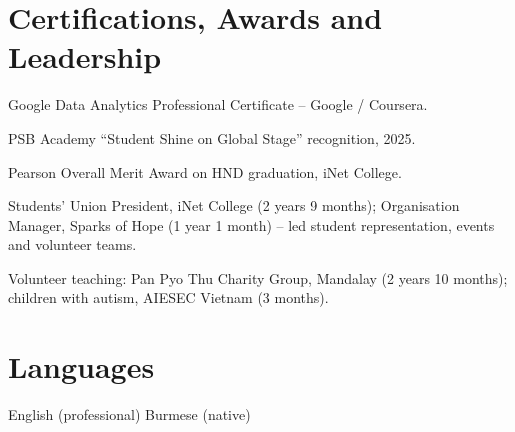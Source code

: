 \documentclass[letterpaper,10pt]{article}
\begin{document}
\section*{Certifications, Awards and Leadership}
\begin{tight}
  \item Google Data Analytics Professional Certificate -- Google / Coursera.
  \item PSB Academy ``Student Shine on Global Stage'' recognition, 2025.
  \item Pearson Overall Merit Award on HND graduation, iNet College.
  \item Students' Union President, iNet College (2 years 9 months); Organisation Manager,
  Sparks of Hope (1 year 1 month) -- led student representation, events and volunteer teams.
  \item Volunteer teaching: Pan Pyo Thu Charity Group, Mandalay (2 years 10 months);
  children with autism, AIESEC Vietnam (3 months).
\end{tight}

\section*{Languages}
English (professional) \textbar{} Burmese (native)
\end{document}
